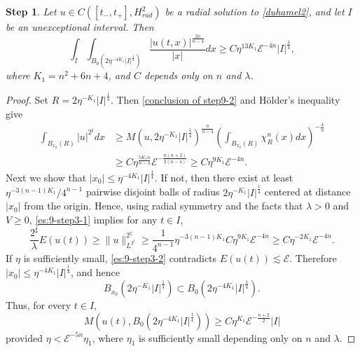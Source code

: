 \documentclass[11pt,a4paper]{article}
\numberwithin{equation}{section}
\newtheorem{step}{Step}[section]
\begin{document}
\begin{step}
Let $u \in C([t_{-}, t_{+}], H^{2}_{rad})$ be a radial solution to \eqref{duhamel2}, and let $I$ be an unexceptional interval.
Then
\begin{equation}\label{conclusion of step9.3}
\int_{I}\int_{B_{0}(2\eta^{-4K_{1}}|I|^{\frac{1}{4}})}\dfrac{|u(t,x)|^{\frac{2n}{n-4}}}{|x|}dx \geq C\eta^{13K_{1}}\mathcal{E}^{-4n}|I|^{\frac{3}{4}},
\end{equation}
where $K_{1} = n^{2} + 6n +4$, and $C$ depends only on $n$ and $\lambda$.
\end{step}

\begin{proof}
Set $R = 2\eta^{-K_{1}}|I|^{\frac{1}{4}}$. Then \eqref{conclusion of step9-2} and H\"older's inequality give
\begin{equation}\label{es:9-step3-1}
\begin{aligned}
\int_{B_{x_{0}}(R)} |u|^{2^{\sharp}} dx
&\geq M(u, 2\eta^{-K_{1}}|I|^{\frac{1}{4}})^{\frac{n}{n-4}} \left( \int_{B_{x_{0}}(R)} \chi_{R}^{n}(x) dx \right)^{-\frac{4}{n}} \\
&\geq C\eta^{\frac{5K_{1}n}{n-4}}\mathcal{E}^{-\frac{n(n+2)}{2(n-4)}} \geq C\eta^{9K_{1}}\mathcal{E}^{-4n}.
\end{aligned}
\end{equation}
Next we show that $|x_{0}| \leq \eta^{-4K_{1}}|I|^{\frac{1}{4}}$. If not, then there exist at least $\eta^{-3(n-1)K_{1}}/ 4^{n-1}$ pairwise disjoint balls of radius $2\eta^{-K_{1}}|I|^{\frac{1}{4}}$ centered at distance $|x_{0}|$ from the origin.
Hence, using radial symmetry and the facts that $\lambda > 0$ and $V \geq 0$, \eqref{es:9-step3-1} implies for any $t \in I$,
\begin{equation}\label{es:9-step3-2}
\dfrac{2^{\sharp}}{\lambda} E(u(t))
\geq \|u\|_{L^{2^{\sharp}}}^{2^{\sharp}}
\geq \dfrac{1}{4^{n-1}}\eta^{-3(n-1)K_{1}}C\eta^{9K_{1}}\mathcal{E}^{-4n}
\geq C\eta^{-2K_{1}}\mathcal{E}^{-4n}.
\end{equation}
If $\eta$ is sufficiently small, \eqref{es:9-step3-2} contradicts $E(u(t)) \lesssim \mathcal{E}$.
Therefore $|x_{0}| \leq \eta^{-4K_{1}}|I|^{\frac{1}{4}}$, and hence
\[
B_{x_{0}}(2\eta^{-K_{1}}|I|^{\frac{1}{4}}) \subset B_{0}(2\eta^{-4K_{1}}|I|^{\frac{1}{4}}).
\]
Thus, for every $t\in I$,
\begin{equation}\label{es:9-step3-3}
M\left(u(t), B_{0}(2\eta^{-4K_{1}}|I|^{\frac{1}{4}})\right) \geq C\eta^{K_{1}}\mathcal{E}^{-\frac{n+2}{2}}|I|
\end{equation}
provided $\eta < \mathcal{E}^{-5n}\eta_{1}$, where $\eta_{1}$ is sufficiently small depending only on $n$ and $\lambda$.

\end{proof}
\end{document}
